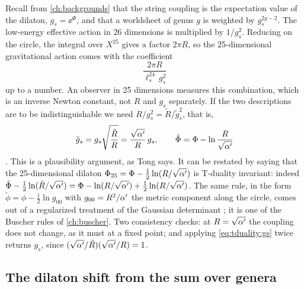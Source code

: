 Recall from \cref{ch:backgrounds} that the string coupling is the expectation value of the
dilaton, $g_s=\ee^{\Phi}$, and that a worldsheet of genus $g$ is weighted by $g_s^{2g-2}$.
The low-energy effective action in 26 dimensions is multiplied by $1/g_s^2$. Reducing on
the circle, the integral over $X^{25}$ gives a factor $2\pi R$, so the 25-dimensional
gravitational action comes with the coefficient
\begin{equation}\label{eq:tduality:G25}
  \frac{2\pi R}{\ell_s^{24}\,g_s^2}
\end{equation}
up to a number. An observer in 25 dimensions measures this combination, which is an inverse
Newton constant, not $R$ and $g_s$ separately. If the two descriptions are to be
indistinguishable we need $R/g_s^2=\tilde R/\tilde g_s^2$, that is,
\begin{equation}\label{eq:tduality:gs}
  \tilde g_s=g_s\sqrt{\frac{\tilde R}{R}}=\frac{\sqrt{\alpha'}}{R}\,g_s,\qquad
  \tilde\Phi=\Phi-\ln\frac{R}{\sqrt{\alpha'}}
\end{equation}
. This is a
plausibility argument, as Tong says. It can be restated by saying that the 25-dimensional dilaton
$\Phi_{25}=\Phi-\frac12\ln(R/\sqrt{\alpha'})$ is T-duality invariant: indeed
$\tilde\Phi-\frac12\ln(\tilde R/\sqrt{\alpha'})=\Phi-\ln(R/\sqrt{\alpha'})+\frac12\ln(R/\sqrt{\alpha'})$. The
same rule, in the form $\tilde\phi=\phi-\frac12\ln g_{00}$ with $g_{00}=R^2/\alpha'$ the metric
component along the circle, comes out of a regularized treatment of the Gaussian determinant
; it is one of the Buscher rules of
\cref{ch:buscher}. Two consistency checks: at $R=\sqrt{\alpha'}$ the coupling does not change, as it
must at a fixed point; and applying \eqref{eq:tduality:gs} twice returns $g_s$, since
$(\sqrt{\alpha'}/\tilde R)(\sqrt{\alpha'}/R)=1$.

\subsection{The dilaton shift from the sum over genera}

